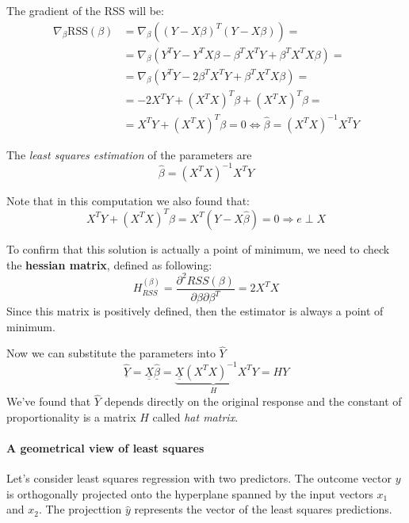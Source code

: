 The gradient of the RSS will be:
\begin{align*}
    \nabla_\beta \text{RSS} (\beta) & = \nabla_\beta \left((Y- X\beta)^T (Y-X\beta) \right) =                                 \\
                                    & = \nabla_\beta \left(Y^T Y - Y^T X\beta - \beta^T X^T Y + \beta^T X^T X \beta \right) = \\
                                    & = \nabla_\beta\left(Y^T Y - 2 \beta^T X^T Y + \beta^T X^T X \beta\right) =              \\
                                    & = -2 X^T Y + (X^T X)^T \beta + (X^T X)^T \beta =                                        \\
                                    & = X^T Y + (X^T X)^T \beta = 0 \iff \hat{\beta} = (X^T X)^{-1} X^T Y
\end{align*}

The \textit{least squares estimation} of the parameters are
\[
    \hat{\beta} = (X^T X)^{-1} X^T Y
\]

Note that in this computation we also found that:
\[
    X^T Y + (X^T X)^T \beta = X^T(Y-X\hat{\beta}) = 0 \Rightarrow e \perp X
\]

To confirm that this solution is actually a point of minimum, we need to check the \textbf{hessian matrix}, defined as following:
\[
    H_{RSS}^(\beta) = \frac{\partial^2 RSS(\beta)}{\partial \beta \partial \beta^T} = 2 X^T X
\]
Since this matrix is positively defined, then the estimator is always a point of minimum.

Now we can substitute the parameters into $\hat{Y}$
\[
    \underline{\hat{Y}} = \underline{\underline{X}} \underline{\hat{\beta}} =   \underbrace{\underline{\underline{X}} (X^T X)^{-1} X^T}_{H} Y = HY
\]
We've found that $\hat{Y}$ depends directly on the original response and the constant of proportionality is a matrix $H$ called \textit{hat matrix}.



\paragraph*{A geometrical view of least squares}
Let's consider least squares regression with two predictors. The outcome vector $y$ is orthogonally projected onto the hyperplane spanned by the input vectors $x_1$ and $x_2$. The projecttion $\hat{y}$ represents the vector of the least squares predictions.

